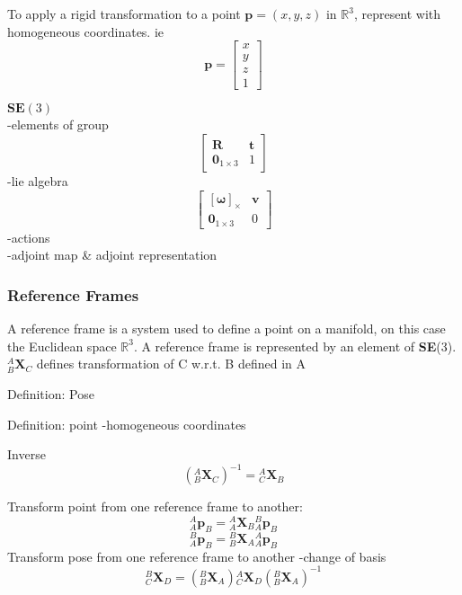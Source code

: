 		To apply a rigid transformation to a point $\textbf{p} = (x,y,z) $ in $\mathbb{R}^3$, represent with homogeneous coordinates. ie
		\begin{equation}
		\mathbf{p} = 
		\begin{bmatrix}
				  x	\\
				  y	\\
				  z	\\
				  1	
		\end{bmatrix}
		\end{equation}
	
		\textbf{ $\textbf{SE}(3)$}\\
		-elements of group\\
		\begin{equation}
			\begin{bmatrix}
				\mathbf{R}	&	\mathbf{t} \\
			  	\textbf{0}_{1 \times 3}		& 	1 
			\end{bmatrix}
		\end{equation}
		-lie algebra\\
		\begin{equation}
			\begin{bmatrix}
				  [\mathbf{\omega}]_\times	&  \mathbf{v}\\
				  \textbf{0}_{1 \times 3} & 0						  
			\end{bmatrix}
		\end{equation}
		-actions\\
		-adjoint map \& adjoint representation
		
	\subsubsection{Reference Frames}
		A reference frame is a system used to define a point on a manifold, on this case the Euclidean space $\mathbb{R}^3$. A reference frame is represented by an element of \textbf{SE}(3).\\
		$^{A}_{B}\mathbf{X}^{}_{C}$ defines transformation of C w.r.t. B defined in A
		
		Definition: Pose
			
		Definition: point
		-homogeneous coordinates		
		
		Inverse
		\begin{equation}
			({^{A}_{B}\mathbf{X}^{}_{C}})^{-1} = {^{A}_{C}\mathbf{X}^{}_{B}}
		\end{equation}
		
		Transform point from one reference frame to another:
		\begin{equation}
			{^{A}_{A}\mathbf{p}^{}_{B}} = {^{A}_{A}\mathbf{X}^{}_{B}}{^{B}_{A}\mathbf{p}^{}_{B}}
		\end{equation}
		\begin{equation}
			{^{B}_{A}\mathbf{p}^{}_{B}} = {^{B}_{B}\mathbf{X}^{}_{A}}{^{A}_{A}\mathbf{p}^{}_{B}}
		\end{equation}
		Transform pose from one reference frame to another	
		-change of basis
		\begin{equation}
			{^{B}_{C}\mathbf{X}^{}_{D}} = ({^{B}_{B}\mathbf{X}^{}_{A}}){^{A}_{C}\mathbf{X}^{}_{D}}({^{B}_{B}\mathbf{X}^{}_{A}})^{-1}
		\end{equation}

